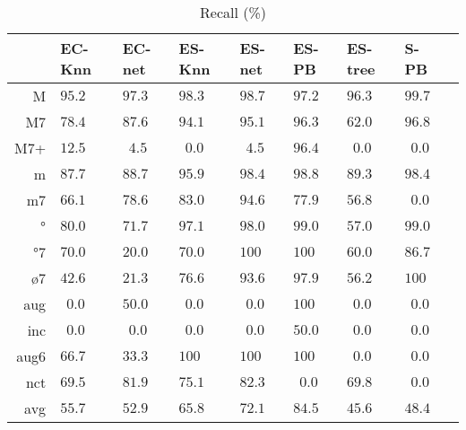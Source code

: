\begin{table}
  \centering
\begin{tabular}{r|p{0.5cm}p{0.5cm}p{0.5cm}p{0.5cm}p{0.5cm}p{0.5cm}p{0.5cm}p{0.5cm}}
     &   EC-Knn &   EC-net &   ES-Knn &   ES-net &    ES-PB &  ES-tree &     S-PB \\ \hline
   M & $  95.2$ & $  97.3$ & $  98.3$ & $  98.7$ & $  97.2$ & $  96.3$ & $  99.7$ \\
  M7 & $  78.4$ & $  87.6$ & $  94.1$ & $  95.1$ & $  96.3$ & $  62.0$ & $  96.8$ \\
 M7+ & $  12.5$ & $ ~~4.5$ & $ ~~0.0$ & $ ~~4.5$ & $  96.4$ & $ ~~0.0$ & $ ~~0.0$ \\
   m & $  87.7$ & $  88.7$ & $  95.9$ & $  98.4$ & $  98.8$ & $  89.3$ & $  98.4$ \\
  m7 & $  66.1$ & $  78.6$ & $  83.0$ & $  94.6$ & $  77.9$ & $  56.8$ & $ ~~0.0$ \\
   ° & $  80.0$ & $  71.7$ & $  97.1$ & $  98.0$ & $  99.0$ & $  57.0$ & $  99.0$ \\
  °7 & $  70.0$ & $  20.0$ & $  70.0$ & $ 100  $ & $ 100  $ & $  60.0$ & $  86.7$ \\
  ø7 & $  42.6$ & $  21.3$ & $  76.6$ & $  93.6$ & $  97.9$ & $  56.2$ & $ 100$ \\
 aug & $ ~~0.0$ & $  50.0$ & $ ~~0.0$ & $ ~~0.0$ & $ 100  $ & $ ~~0.0$ & $ ~~0.0$ \\
 inc & $ ~~0.0$ & $ ~~0.0$ & $ ~~0.0$ & $ ~~0.0$ & $  50.0$ & $ ~~0.0$ & $ ~~0.0$ \\
aug6 & $  66.7$ & $  33.3$ & $ 100  $ & $ 100  $ & $ 100  $ & $ ~~0.0$ & $ ~~0.0$ \\
 nct & $  69.5$ & $  81.9$ & $  75.1$ & $  82.3$ & $ ~~0.0$ & $  69.8$ & $ ~~0.0$ \\
\hline                                                       
 avg & $  55.7$ & $  52.9$ & $  65.8$ & $  72.1$ & $  84.5$ & $  45.6$ & $  48.4$ \\
\end{tabular}


  \caption{Recall (\%)}
  \label{tab:recall}
\end{table}


